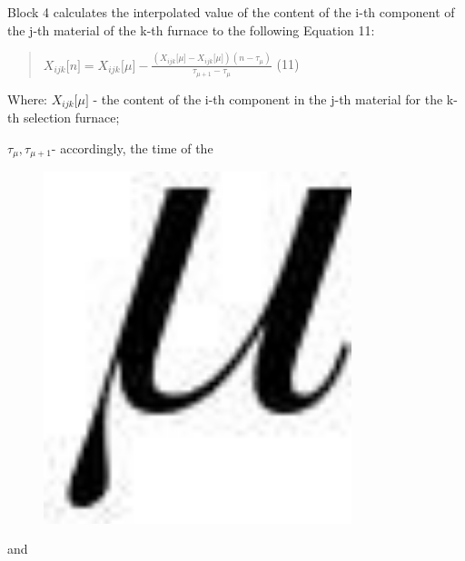 Block 4 calculates the interpolated value of the content of the i-th
component of the j-th material of the k-th furnace to the following
Equation 11:

\begin{quote}
\(Χ_{ijk}\lbrack n\rbrack = Χ_{ijk_{}}\lbrack\mu\rbrack - \frac{\left( Χ_{ijk}\lbrack\mu\rbrack - Χ_{ijk}\lbrack\mu\rbrack \right)\left( n - \tau_{\mu} \right)}{\tau_{\mu + 1} - \tau_{\mu}}\)
(11)
\end{quote}

Where: \(X_{ijk}\lbrack\mu\rbrack\) - the content of the i-th component
in the j-th material for the k-th selection furnace;

\(\tau_{\mu},\tau_{\mu + 1}\)- accordingly, the time of the
\begin{figure}[H]
	\centering
	\includegraphics[width=0.8\textwidth]{assets/8}
	\caption*{}
\end{figure} and
